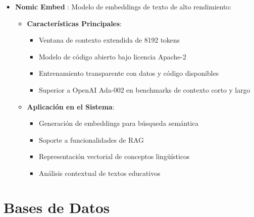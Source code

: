 \begin{itemize}
	\item \textbf{Nomic Embed} \cite{nussbaum2024nomic}: Modelo de embeddings de texto de alto rendimiento:
		\begin{itemize}
			\item \textbf{Características Principales}:
				\begin{itemize}
				  \item Ventana de contexto extendida de 8192 tokens
				  \item Modelo de código abierto bajo licencia Apache-2
				  \item Entrenamiento transparente con datos y código disponibles
				  \item Superior a OpenAI Ada-002 en benchmarks de contexto corto y largo
				\end{itemize}
			\item \textbf{Aplicación en el Sistema}:
				\begin{itemize}
				  \item Generación de embeddings para búsqueda semántica
				  \item Soporte a funcionalidades de RAG
				  \item Representación vectorial de conceptos lingüísticos
				  \item Análisis contextual de textos educativos
				\end{itemize}
		\end{itemize}
\end{itemize}

\section{Bases de Datos}

